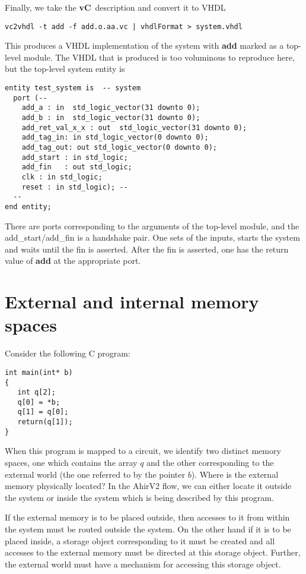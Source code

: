 \documentclass{article}
\newcommand{\vC}{{\bf vC}~}
\begin{document}
Finally, we take the \vC description and convert it to
VHDL
\begin{verbatim}
vc2vhdl -t add -f add.o.aa.vc | vhdlFormat > system.vhdl
\end{verbatim}
This produces a VHDL implementation of the system with
{\bf add} marked as a top-level module.  The VHDL that
is produced is too voluminous to reproduce here, but
the top-level system entity is
\begin{verbatim}
entity test_system is  -- system
  port (--
    add_a : in  std_logic_vector(31 downto 0);
    add_b : in  std_logic_vector(31 downto 0);
    add_ret_val_x_x : out  std_logic_vector(31 downto 0);
    add_tag_in: in std_logic_vector(0 downto 0);
    add_tag_out: out std_logic_vector(0 downto 0);
    add_start : in std_logic;
    add_fin   : out std_logic;
    clk : in std_logic;
    reset : in std_logic); --
  --
end entity;
\end{verbatim}
There are ports corresponding to the arguments of the top-level module,
and the add\_start/add\_fin is a handshake pair.  One sets of the inputs,
starts the system and waits until the fin is asserted.  After the fin
is asserted, one has the return value of {\bf add} at the appropriate port.

\section{External and internal memory spaces}

Consider the following C program:
\begin{verbatim}
int main(int* b)
{
   int q[2];
   q[0] = *b;
   q[1] = q[0];
   return(q[1]);
}
\end{verbatim}
When this program is mapped to a circuit, we identify 
two distinct memory spaces, one which contains the
array $q$ and the other corresponding to the 
external world (the one referred to by the pointer $b$).
Where is the external memory physically located?  In 
the AhirV2 flow, we can either locate it outside
the system or inside the system which is being 
described by this program.

If the external memory is to be placed outside, then
accesses to it from within the system must be routed
outside the system.  On the other hand if it is
to be placed inside, a storage object corresponding 
to it must be created and all accesses to the external
memory must be directed at this storage object.
Further, the external world must have a mechanism for
accessing this storage object.
\end{document}
